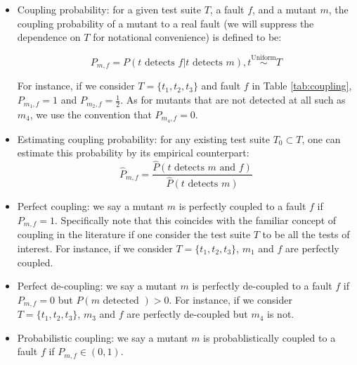 \documentclass[10pt,letterpaper]{article}
\begin{document}
\begin{itemize}
    \item
    Coupling probability: for a given test suite $T$, a fault $f$, and a mutant $m$, the coupling probability of a mutant to a real fault (we will suppress the dependence on $T$ for notational convenience) is defined to be:
    
\begin{equation}
P_{m,f} = P(t \text{ detects } f | t \text{ detects } m), t\stackrel{\text{Uniform}}{\sim} T
\end{equation}

For instance, if we consider $T=\{t_1,t_2,t_3\}$ and fault $f$ in Table \ref{tab:coupling}, $P_{m_1,f}= 1  $ and $P_{m_2,f} = \frac{1}{2}$. As for mutants that are not detected at all such as $m_4$, we use the convention that $P_{m_4,f} = 0$.

\item 
Estimating coupling probability: 
for any existing test suite $T_0 \subset T$, one can estimate this probability by its empirical counterpart:
\begin{equation}
\hat{P}_{m,f} =  \frac{\hat{P}(t \text{ detects } m \text{ and } f )}{\hat{P}(t \text{ detects } m)}
\end{equation} 

\item
Perfect coupling: we say a mutant $m$ is perfectly coupled to a fault $f$ if $P_{m,f}= 1$. Specifically note that this coincides with the familiar concept of coupling in the literature if one consider the test suite $T$ to be all the tests of interest. For instance, if we consider $T = \{t_1,t_2,t_3\}$, $m_1$ and $f$ are perfectly coupled.


\item
Perfect de-coupling: we say a mutant $m$ is perfectly de-coupled to a fault $f$ if $P_{m,f}= 0$ but $P(m \text{ detected }) > 0$. For instance, if we consider $T = \{t_1,t_2,t_3\}$, $m_3$ and $f$ are perfectly de-coupled but $m_4$ is not.

\item
Probabilistic coupling:  we say a mutant $m$ is probablistically coupled to a fault $f$ if $P_{m,f}\in (0,1)$.



\end{itemize}
\end{document}
